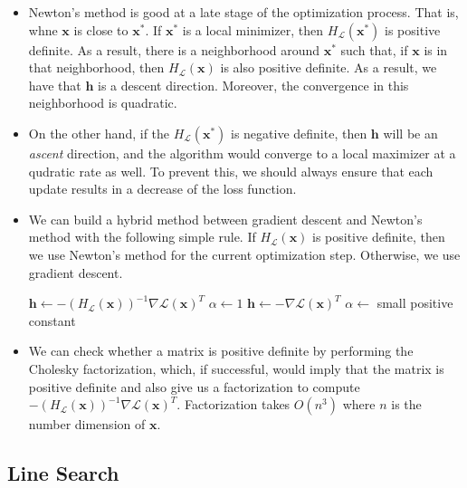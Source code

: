 \documentclass[10pt]{article}
\newcommand{\ve}[1]{\mathbf{#1}}
\newcommand{\mcal}[1]{\mathcal{#1}}
\begin{document}
\begin{itemize}
    \item Newton's method is good at a late stage of the optimization process. That is, whne $\ve{x}$ is close to $\ve{x}^*$. If $\ve{x}^*$ is a local minimizer, then $H_{\mcal{L}}(\ve{x}^*)$ is positive definite. As a result, there is a neighborhood around $\ve{x}^*$ such that, if $\ve{x}$ is in that neighborhood, then $H_{\mcal{L}}(\ve{x})$ is also positive definite. As a result, we have that $\ve{h}$ is a descent direction. Moreover, the convergence in this neighborhood is quadratic.
    
    \item On the other hand, if the $H_{\mcal{L}}(\ve{x}^*)$ is negative definite, then $\ve{h}$ will be an \emph{ascent} direction, and the algorithm would converge to a local maximizer at a qudratic rate as well. To prevent this, we should always ensure that each update results in a decrease of the loss function.
    
    \item We can build a hybrid method between gradient descent and Newton's method with the following simple rule. If $H_{\mcal{L}}(\ve{x})$ is positive definite, then we use Newton's method for the current optimization step. Otherwise, we use gradient descent.
    \medskip
    \begin{algorithmic}
        \If {$H_{\mcal{L}}(\ve{x})$ is postiive definite}
            \State $\ve{h} \gets - (H_{\mcal{L}}(\ve{x}))^{-1} \nabla\mcal{L}(\ve{x})^T$
            \State $\alpha \gets 1$
        \Else
        \State $\ve{h} \gets - \nabla\mcal{L}(\ve{x})^T$
        \State $\alpha \gets $ small positive constant
        \EndIf
    \end{algorithmic}

    \item We can check whether a matrix is positive definite by performing the Cholesky factorization, which, if successful, would imply that the matrix is positive definite and also give us a factorization to compute $- (H_{\mcal{L}}(\ve{x}))^{-1} \nabla\mcal{L}(\ve{x})^T$. Factorization takes $O(n^3)$ where $n$ is the number dimension of $\ve{x}$.
\end{itemize}

\subsection{Line Search}
\end{document}

